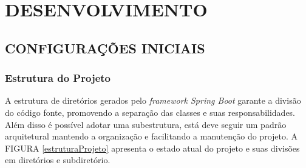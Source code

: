 



\chapter{DESENVOLVIMENTO}


\section{CONFIGURAÇÕES INICIAIS}

\subsection{Estrutura do Projeto}



A estrutura de diretórios gerados pelo \textit{framework Spring Boot} garante a divisão do código fonte, promovendo a separação das classes e suas responsabilidades. Além disso é possível adotar uma subestrutura, está deve seguir um padrão arquitetural mantendo a organização e facilitando a manutenção do projeto. A FIGURA \ref{estruturaProjeto} apresenta o estado atual do projeto e suas divisões em diretórios e subdiretório. 


